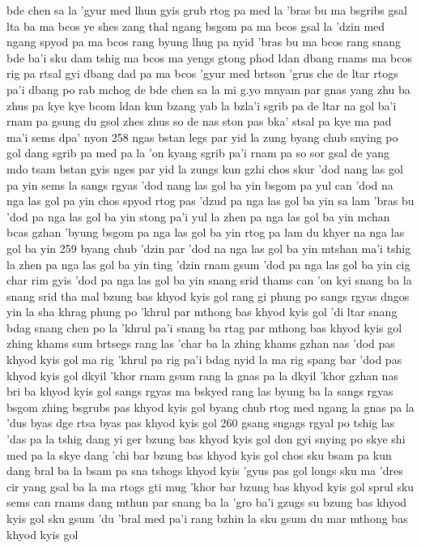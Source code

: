 bde chen sa la 'gyur med lhun gyis grub
rtog pa med la 'bras bu ma bsgribs gsal
lta ba ma bcos ye shes zang thal ngang
bsgom pa ma bcos gsal la 'dzin med ngang
spyod pa ma bcos rang byung lhug pa nyid
'bras bu ma bcos rang snang bde ba'i sku
dam tshig ma bcos ma yengs gtong phod ldan
dbang rnams ma bcos rig pa rtsal gyi dbang
dad pa ma bcos 'gyur med brtson 'grus che
de ltar rtogs pa'i dbang po rab mchog de
bde chen sa la mi g.yo mnyam par gnas
yang zhu ba zhus pa
kye kye bcom ldan kun bzang yab
la bzla'i sgrib pa de ltar na
gol ba'i rnam pa gsung du gsol
zhes zhus so
de nas ston pas bka' stsal pa
kye ma pad ma'i sems dpa' nyon
258
ngas bstan legs par yid la zung
byang chub snying po gol dang sgrib pa med pa la
'on kyang sgrib pa'i rnam pa so sor gsal
de yang mdo tsam bstan gyis nges par yid la zungs
kun gzhi chos skur 'dod nang las gol pa yin
sems la sangs rgyas 'dod nang las gol ba yin
bsgom pa yul can 'dod na nga las gol pa yin
chos spyod rtog pas 'dzud pa nga las gol ba yin
sa lam 'bras bu 'dod pa nga las gol ba yin
stong pa'i yul la zhen pa nga las gol ba yin
mchan bcas gzhan 'byung bsgom pa nga las gol ba yin
rtog pa lam du khyer na nga las gol ba yin
259
byang chub 'dzin par 'dod na nga las gol ba yin
mtshan ma'i tshig la zhen pa nga las gol ba yin
ting 'dzin rnam gsum 'dod pa nga las gol ba yin
cig char rim gyis 'dod pa nga las gol ba yin
snang srid thams can 'on kyi snang ba la
snang srid tha mal bzung bas khyod kyis gol
rang gi phung po sangs rgyas dngos yin la
sha khrag phung po 'khrul par mthong bas khyod kyis gol
'di ltar snang bdag snang chen po la
'khrul pa'i snang ba rtag par mthong bas khyod kyis gol
zhing khams sum brtsegs rang las 'char ba la
zhing khams gzhan nas 'dod pas khyod kyis gol
ma rig 'khrul pa rig pa'i bdag nyid la
ma rig spang bar 'dod pas khyod kyis gol
dkyil 'khor rnam gsum rang la gnas pa la
dkyil 'khor gzhan nas bri ba khyod kyis gol
sangs rgyas ma bskyed rang las byung ba la
sangs rgyas bsgom zhing bsgrubs pas khyod kyis gol
byang chub rtog med ngang la gnas pa la
'dus byas dge rtsa byas pas khyod kyis gol
260
gsang sngags rgyal po tshig las 'das pa la
tshig dang yi ger bzung bas khyod kyis gol
don gyi snying po skye shi med pa la
skye dang 'chi bar bzung bas khyod kyis gol
chos sku bsam pa kun dang bral ba la
bsam pa sna tshogs khyod kyis 'gyus pas gol
longs sku ma 'dres cir yang gsal ba la
ma rtogs gti mug 'khor bar bzung bas khyod kyis gol
sprul sku sems can rnams dang mthun par snang ba la
'gro ba'i gzugs su bzung bas khyod kyis gol
sku gsum 'du 'bral med pa'i rang bzhin la
sku gsum du mar mthong bas khyod kyis gol
